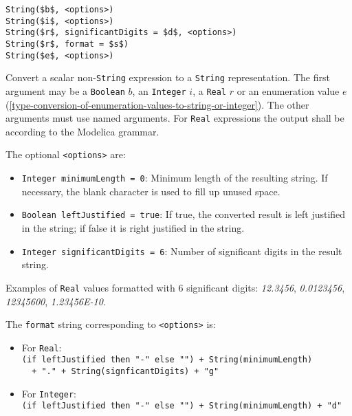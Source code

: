 \begin{operatordefinition*}[String]\label{modelica:to-String}
\begin{synopsis}\begin{lstlisting}
String($b$, <options>)
String($i$, <options>)
String($r$, significantDigits = $d$, <options>)
String($r$, format = $s$)
String($e$, <options>)
\end{lstlisting}\end{synopsis}
\begin{semantics}
Convert a scalar non-\lstinline!String! expression to a \lstinline!String! representation.
The first argument may be a \lstinline!Boolean! $b$, an \lstinline!Integer! $i$, a \lstinline!Real! $r$ or an enumeration value $e$ (\cref{type-conversion-of-enumeration-values-to-string-or-integer}).
The other arguments must use named arguments.
For \lstinline!Real! expressions the output shall be according to the Modelica grammar.

The optional \lstinline!<options>! are:
\begin{itemize}
\item
  \lstinline!Integer minimumLength = 0!: Minimum length of the resulting string.
  If necessary, the blank character is used to fill up unused space.
\item
  \lstinline!Boolean leftJustified = true!: If true, the converted result is left justified in the string; if false it is right justified in the string.
\item
  \lstinline!Integer significantDigits = 6!: Number of significant digits in the result string.
\end{itemize}

\begin{nonnormative}
Examples of \lstinline!Real! values formatted with 6 significant digits: \emph{12.3456}, \emph{0.0123456}, \emph{12345600}, \emph{1.23456E-10}.
\end{nonnormative}

The \lstinline!format! string corresponding to \lstinline!<options>! is:
\begin{itemize}
\item
  For \lstinline!Real!:\\
  \lstinline!(if leftJustified then "-" else "") + String(minimumLength)!\\
  \lstinline!  + "." + String(signficantDigits) + "g"!
\item
  For \lstinline!Integer!:\\
  \lstinline!(if leftJustified then "-" else "") + String(minimumLength) + "d"!
\end{itemize}


\end{semantics}
\end{operatordefinition*}

